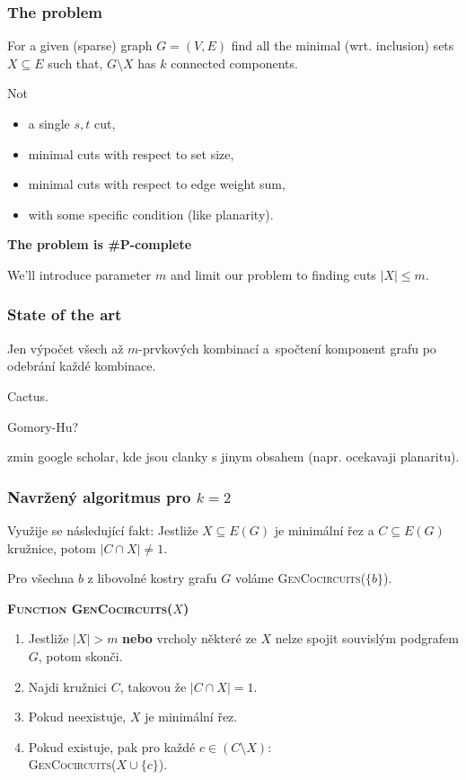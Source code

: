 \documentclass[10pt]{beamer}
\begin{document}
\begin{frame}[fragile]
	\frametitle{The problem}


	For a given (sparse) graph $G = (V, E)$ find all the minimal (wrt.
	inclusion) sets $X \subseteq E$ such that, $G \setminus X$ has $k$
	connected components. \\

	\bigskip

	Not
	\begin{itemize}
		\item a single $s,t$ cut,
		\item minimal cuts with respect to set size,
		\item minimal cuts with respect to edge weight sum,
		\item with some specific condition (like planarity).
	\end{itemize}

	\bigskip
	\textbf{The problem is \#P-complete}

	We'll introduce parameter $m$ and limit our problem to finding cuts $\lvert
	X \rvert \leq m$.


\end{frame}

\begin{frame}[fragile]
	\frametitle{State of the art}

		Jen výpočet všech až $m$-prvkových kombinací a~spočtení komponent grafu po odebrání každé kombinace.

		Cactus.

	Gomory-Hu?

	zmin google scholar, kde jsou clanky s jinym obsahem (napr. ocekavaji planaritu).

\end{frame}

\begin{frame}[fragile]
	\frametitle{Navržený algoritmus pro $k = 2$}

	Využije se následující fakt: Jestliže $X \subseteq E(G)$ je minimální řez a $C \subseteq E(G)$ kružnice, potom $\lvert C \cap X \rvert \neq 1$.

	Pro všechna $b$ z libovolné kostry grafu $G$ voláme \textsc{GenCocircuits}($\{b\}$).

	\textbf{\textsc{Function GenCocircuits}($X$)}
	\begin{enumerate}
		\item Jestliže $\lvert X \rvert > m$ \textbf{nebo} vrcholy některé ze  $X$ nelze spojit souvislým podgrafem $G$, potom skonči.
		\item Najdi kružnici $C$, takovou že $\lvert C \cap X \rvert = 1$.
		\item Pokud neexistuje, $X$ je minimální řez.
		\item Pokud existuje, pak pro každé $c \in (C \setminus X)$: \\
			\hspace{12pt} \textsc{GenCocircuits}($X \cup \{c\}$).
	\end{enumerate}

\end{frame}
\end{document}
